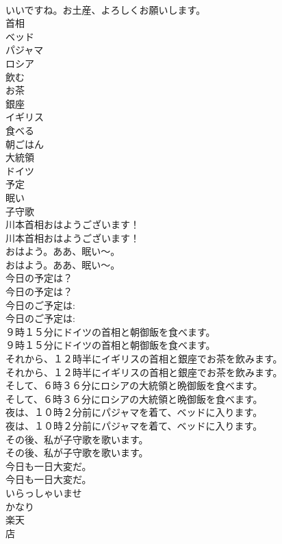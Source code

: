 \documentclass[8pt]{extreport}
\begin{document}
\begin{CJK}{UTF8}{min}
\\	いいですね。お土産、よろしくお願いします。 
\\	首相
\\	ベッド
\\	パジャマ
\\	ロシア
\\	飲む
\\	お茶
\\	銀座
\\	イギリス
\\	食べる
\\	朝ごはん
\\	大統領
\\	ドイツ
\\	予定
\\	眠い
\\	子守歌
\\	川本首相おはようございます！	
\\	川本首相おはようございます！ 
\\	おはよう。ああ、眠い～。	
\\	おはよう。ああ、眠い～。 
\\	今日の予定は？	
\\	今日の予定は？ 
\\	今日のご予定は:	
\\	今日のご予定は: 
\\	９時１５分にドイツの首相と朝御飯を食べます。	
\\	９時１５分にドイツの首相と朝御飯を食べます。 
\\	それから、１２時半にイギリスの首相と銀座でお茶を飲みます。	
\\	それから、１２時半にイギリスの首相と銀座でお茶を飲みます。 
\\	そして、６時３６分にロシアの大統領と晩御飯を食べます。	
\\	そして、６時３６分にロシアの大統領と晩御飯を食べます。 
\\	夜は、１０時２分前にパジャマを着て、ベッドに入ります。	
\\	夜は、１０時２分前にパジャマを着て、ベッドに入ります。 
\\	その後、私が子守歌を歌います。	
\\	その後、私が子守歌を歌います。 
\\	今日も一日大変だ。	
\\	今日も一日大変だ。 
\\	いらっしゃいませ
\\	かなり
\\	楽天
\\	店

\end{CJK}
\end{document}
